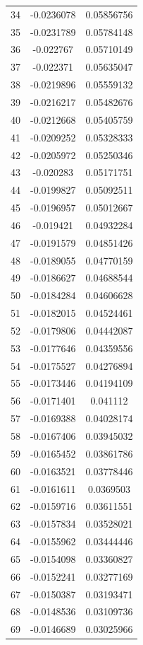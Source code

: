 \documentclass[a4paper, 11pt, oneside]{report}
\begin{document}
{\begin{longtable}{|c|c|c|}
34  & -0.0236078 & 0.05856756 \\
35  & -0.0231789 & 0.05784148 \\
36  & -0.022767  & 0.05710149 \\
37  & -0.022371  & 0.05635047 \\
38  & -0.0219896 & 0.05559132 \\
39  & -0.0216217 & 0.05482676 \\
40  & -0.0212668 & 0.05405759 \\
41  & -0.0209252 & 0.05328333 \\
42  & -0.0205972 & 0.05250346 \\
43  & -0.020283  & 0.05171751 \\
44  & -0.0199827 & 0.05092511 \\
45  & -0.0196957 & 0.05012667 \\
46  & -0.019421  & 0.04932284 \\
47  & -0.0191579 & 0.04851426 \\
48  & -0.0189055 & 0.04770159 \\
49  & -0.0186627 & 0.04688544 \\
50  & -0.0184284 & 0.04606628 \\
51  & -0.0182015 & 0.04524461 \\
52  & -0.0179806 & 0.04442087 \\
53  & -0.0177646 & 0.04359556 \\
54  & -0.0175527 & 0.04276894 \\
55  & -0.0173446 & 0.04194109 \\
56  & -0.0171401 & 0.041112   \\
57  & -0.0169388 & 0.04028174 \\
58  & -0.0167406 & 0.03945032 \\
59  & -0.0165452 & 0.03861786 \\
60  & -0.0163521 & 0.03778446 \\
61  & -0.0161611 & 0.0369503  \\
62  & -0.0159716 & 0.03611551 \\
63  & -0.0157834 & 0.03528021 \\
64  & -0.0155962 & 0.03444446 \\
65  & -0.0154098 & 0.03360827 \\
66  & -0.0152241 & 0.03277169 \\
67  & -0.0150387 & 0.03193471 \\
68  & -0.0148536 & 0.03109736 \\
69  & -0.0146689 & 0.03025966 \\

\end{longtable}}
\end{document}
